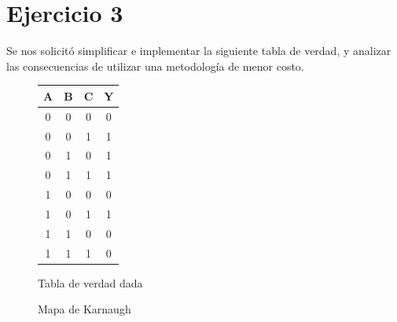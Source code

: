 \part*{Ejercicio 3}

Se nos solicitó simplificar e implementar la siguiente tabla de verdad, y analizar las consecuencias de utilizar una metodología de menor costo.


\begin{figure}[H]
\begin{center}
  \begin{minipage}[b]{0.4\textwidth}
  	\begin{center}
  		\begin{tabular}{ccc|c}
A & B & C & Y \\ 
\hline
0 & 0 & 0 & 0 \\  
0 & 0 & 1 & 1 \\  
0 & 1 & 0 & 1 \\  
0 & 1 & 1 & 1 \\  
1 & 0 & 0 & 0 \\  
1 & 0 & 1 & 1 \\  
1 & 1 & 0 & 0 \\  
1 & 1 & 1 & 0 \\  
\end{tabular} 
  	\end{center}
  \caption{Tabla de verdad dada} 
  \label{3_fig1}
  \end{minipage}
  \begin{minipage}[b]{0.4\textwidth}
    \begin{center}
  		\begin{Karnaughvuit}
   \indeterminats{}
\end{Karnaughvuit}
	\end{center}
  \caption{Mapa de Karnaugh} 
  \label{3_fig2}
 \end{minipage}
\end{center}
\end{figure}


